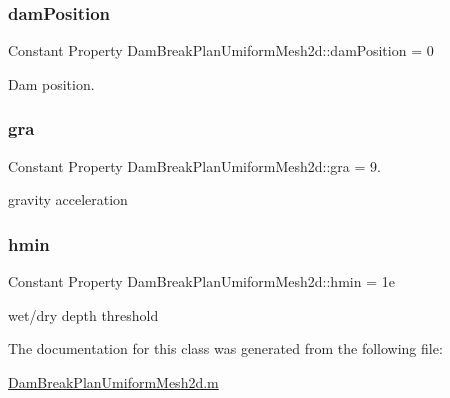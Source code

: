 \subsubsection{\texorpdfstring{dam\+Position}{damPosition}}
{\footnotesize\ttfamily Constant Property Dam\+Break\+Plan\+Umiform\+Mesh2d\+::dam\+Position = 0}



Dam position. 

\mbox{\label{class_dam_break_plan_umiform_mesh2d_a52f52c2885c57619e6fee804e56b29e5}} 
\subsubsection{\texorpdfstring{gra}{gra}}
{\footnotesize\ttfamily Constant Property Dam\+Break\+Plan\+Umiform\+Mesh2d\+::gra = 9.}



gravity acceleration 

\mbox{\label{class_dam_break_plan_umiform_mesh2d_ad9e0a9dc6c19595be2e6511ed508a9a7}} 
\subsubsection{\texorpdfstring{hmin}{hmin}}
{\footnotesize\ttfamily Constant Property Dam\+Break\+Plan\+Umiform\+Mesh2d\+::hmin = 1e}



wet/dry depth threshold 



The documentation for this class was generated from the following file\+:\begin{DoxyCompactItemize}
\item 
\hyperlink{_dam_break_plan_umiform_mesh2d_8m}{Dam\+Break\+Plan\+Umiform\+Mesh2d.\+m}\end{DoxyCompactItemize}
